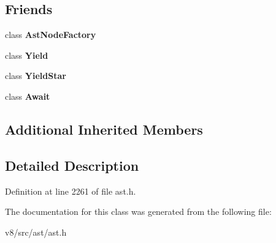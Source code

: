 \subsection*{Friends}
\begin{DoxyCompactItemize}
\item 
\mbox{\label{classv8_1_1internal_1_1Suspend_a8d587c8ad3515ff6433eb83c578e795f}} 
class {\bfseries Ast\+Node\+Factory}
\item 
\mbox{\label{classv8_1_1internal_1_1Suspend_a398377412b06e4711204d84ddf565292}} 
class {\bfseries Yield}
\item 
\mbox{\label{classv8_1_1internal_1_1Suspend_a1cb8cd21d4724c3611ef4a246aecfbba}} 
class {\bfseries Yield\+Star}
\item 
\mbox{\label{classv8_1_1internal_1_1Suspend_a3965dc6217f9f7a5834aa2290da22f96}} 
class {\bfseries Await}
\end{DoxyCompactItemize}
\subsection*{Additional Inherited Members}


\subsection{Detailed Description}


Definition at line 2261 of file ast.\+h.



The documentation for this class was generated from the following file\+:\begin{DoxyCompactItemize}
\item 
v8/src/ast/ast.\+h\end{DoxyCompactItemize}
